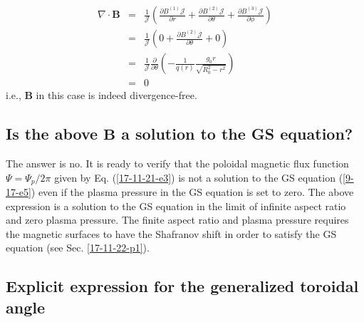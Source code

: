 \documentclass{article}
\begin{document}
\begin{eqnarray}
  \nabla \cdot \mathbf{B} & = & \frac{1}{\mathcal{J}} \left( \frac{\partial
  B^{(1)} \mathcal{J}}{\partial r} + \frac{\partial B^{(2)}
  \mathcal{J}}{\partial \theta} + \frac{\partial B^{(3)} \mathcal{J}}{\partial
  \phi} \right) \nonumber\\
  & = & \frac{1}{\mathcal{J}} \left( 0 + \frac{\partial B^{(2)}
  \mathcal{J}}{\partial \theta} + 0 \right) \nonumber\\
  & = & \frac{1}{\mathcal{J}} \frac{\partial}{\partial \theta} \left( -
  \frac{1}{q (r)}  \frac{g_0 r}{\sqrt{R_0^2 - r^2}} \right) \nonumber\\
  & = & 0 
\end{eqnarray}
i.e., $\mathbf{B}$ in this case is indeed divergence-free.

\subsection{Is the above $\mathbf{B}$ a solution to the GS equation?}

The answer is no. It is ready to verify that the poloidal magnetic flux
function $\Psi = \Psi_p / 2 \pi$ given by Eq. (\ref{17-11-21-e3}) is not a
solution to the GS equation (\ref{9-17-e5}) even if the plasma pressure in the
GS equation is set to zero. The above expression is a solution to the GS
equation in the limit of infinite aspect ratio and zero plasma pressure. The
finite aspect ratio and plasma pressure requires the magnetic surfaces to have
the Shafranov shift in order to satisfy the GS equation (see Sec.
\ref{17-11-22-p1}).

\subsection{Explicit expression for the generalized toroidal angle}
\end{document}
